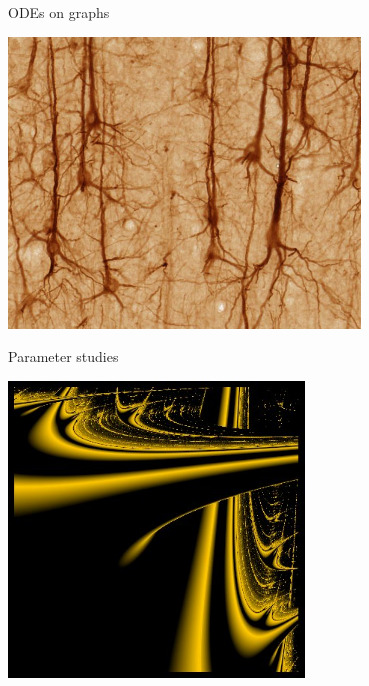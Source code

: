 \begin{frame}
\begin{minipage}{0.48\textwidth}\begin{center}
  ODEs on graphs

  \includegraphics[draft=false,width=0.7\textwidth]{neuron.jpg}
 \end{center}\end{minipage}%
\begin{minipage}{0.48\textwidth}\begin{center}
  Parameter studies
 
  \vspace{0.5ex}
  \includegraphics[draft=false,width=0.59\textwidth]{lyap.jpg}
 \end{center} \end{minipage}



\end{frame}







